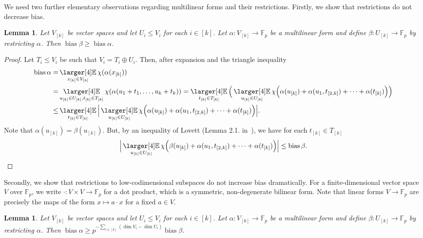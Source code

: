 \documentclass[a4paper,11pt]{article}
\newtheorem{lemma}[theorem]{Lemma}
\theoremstyle{definition}
\newcommand{\on}[1]{
	\operatorname{#1}
}
\newcommand{\exx}{
  \mathop{
    \mathchoice{\vcenter{\hbox{\larger[4]$\mathbb{E}$}}}
               {\kern0pt\mathbb{E}}
               {\kern0pt\mathbb{E}}
               {\kern0pt\mathbb{E}}
  }\displaylimits
}
\begin{document}
We need two further elementary observations regarding multilinear forms and their restrictions. Firstly, we show that restrictions do not decrease bias.

\begin{lemma}\label{formsRestrictionLemma1}
    Let $V_{[k]}$ be vector spaces and let $U_i \leq V_i$ for each $i \in [k]$. Let $\alpha : V_{[k]} \to \mathbb{F}_p$ be a multilinear form and define $\beta : U_{[k]} \to \mathbb{F}_p$ by restricting $\alpha$. Then $\on{bias} \beta \geq \on{bias} \alpha$.
\end{lemma}

\begin{proof}
    Let $T_i \leq V_i$ be such that $V_i = T_i \oplus U_i$. Then, after expansion and the triangle inequality
    \begin{align*}\on{bias} \alpha =& \exx_{x_{[k]} \in V_{[k]}} \chi(\alpha(x_{[k]}))\\
    = & \exx_{u_{[k]} \in U_{[k]}, t_{[k]} \in T_{[k]}} \chi(\alpha(u_1 + t_1, \dots, u_k + t_k)) = \exx_{t_{[k]} \in T_{[k]}} \Big(\exx_{u_{[k]} \in U_{[k]}} \chi\Big(\alpha(u_{[k]}) + \alpha(u_1,t_{[2,k]}) + \dots + \alpha(t_{[k]})\Big)\Big)\\
    \leq & \exx_{t_{[k]} \in T_{[k]}} \Big|\exx_{u_{[k]} \in U_{[k]}} \chi\Big(\alpha(u_{[k]}) + \alpha(u_1,t_{[2,k]}) + \dots + \alpha(t_{[k]})\Big)\Big|.\end{align*}
    Note that $\alpha(u_{[k]}) = \beta(u_{[k]})$. But, by an inequality of Lovett (Lemma 2.1. in~\cite{Lovett}), we have for each $t_{[k]} \in T_{[k]}$ 
    \[\Big|\exx_{u_{[k]} \in U_{[k]}} \chi\Big(\beta(u_{[k]}) + \alpha(u_1,t_{[2,k]}) + \dots + \alpha(t_{[k]})\Big)\Big| \leq \on{bias} \beta.\qedhere\]
\end{proof}

Secondly, we show that restrictions to low-codimensional subspaces do not increase bias dramatically. For a finite-dimensional vector space $V$ over $\mathbb{F}_p$, we write $\cdot : V \times V \to \mathbb{F}_p$ for a dot product, which is a symmetric, non-degenerate bilinear form. Note that linear forms $V \to \mathbb{F}_p$ are precisely the maps of the form $x \mapsto a \cdot x$ for a fixed $a \in V$.

\begin{lemma}\label{formsRestrictionLemma2}
    Let $V_{[k]}$ be vector spaces and let $U_i \leq V_i$ for each $i \in [k]$. Let $\alpha : V_{[k]} \to \mathbb{F}_p$ be a multilinear form and define $\beta : U_{[k]} \to \mathbb{F}_p$ by restricting $\alpha$. Then $\on{bias} \alpha \geq p^{-\sum_{i \in [k]}( \dim V_i - \dim U_i)} \on{bias} \beta$.
\end{lemma}
\end{document}
